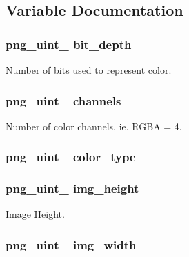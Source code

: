 \subsection{Variable Documentation}
\hypertarget{group__img__data_ga7835dc8f575f80d4d1cf7aef1d63f81b}{
\subsubsection[{bit\_\-depth}]{\setlength{\rightskip}{0pt plus 5cm}png\_\-uint\_ {\bf bit\_\-depth}}}
\label{group__img__data_ga7835dc8f575f80d4d1cf7aef1d63f81b}


Number of bits used to represent color. 

\hypertarget{group__img__data_ga34b2a4058f8d03cffc2a310976840088}{
\subsubsection[{channels}]{\setlength{\rightskip}{0pt plus 5cm}png\_\-uint\_ {\bf channels}}}
\label{group__img__data_ga34b2a4058f8d03cffc2a310976840088}


Number of color channels, ie. RGBA = 4. 

\hypertarget{group__img__data_ga24c3e362df0ac2d93d0d93b204591822}{
\subsubsection[{color\_\-type}]{\setlength{\rightskip}{0pt plus 5cm}png\_\-uint\_ {\bf color\_\-type}}}
\label{group__img__data_ga24c3e362df0ac2d93d0d93b204591822}
\hypertarget{group__img__data_ga5df71b6997d910cdf331cca8996280cb}{
\subsubsection[{img\_\-height}]{\setlength{\rightskip}{0pt plus 5cm}png\_\-uint\_ {\bf img\_\-height}}}
\label{group__img__data_ga5df71b6997d910cdf331cca8996280cb}


Image Height. 

\hypertarget{group__img__data_gac598fa97ed1e4b7114185df9a56a4091}{
\subsubsection[{img\_\-width}]{\setlength{\rightskip}{0pt plus 5cm}png\_\-uint\_ {\bf img\_\-width}}}
\label{group__img__data_gac598fa97ed1e4b7114185df9a56a4091}


